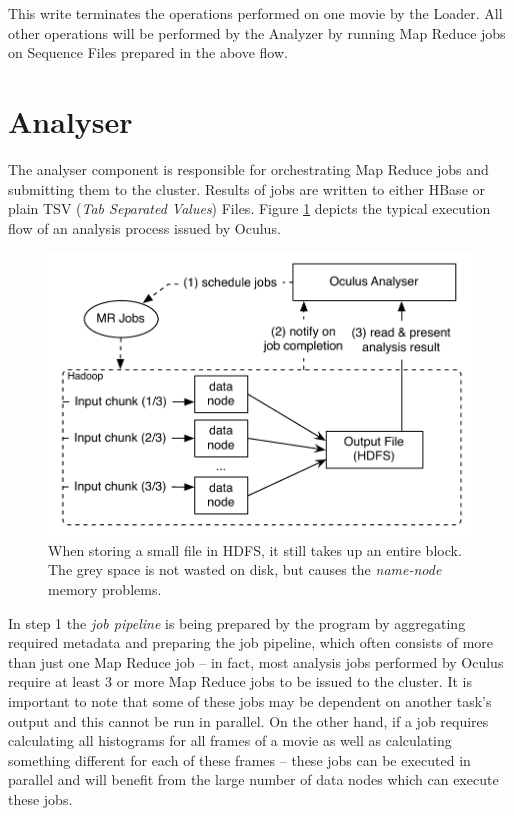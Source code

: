 This write terminates the operations performed on one movie by the Loader. All other operations will be performed by the Analyzer by running Map Reduce jobs on Sequence Files prepared in the above flow.

\section{Analyser}
\label{sec:analyser}
The analyser component is responsible for orchestrating Map Reduce jobs and submitting them to the cluster. Results of jobs are written to either HBase or plain TSV (\textit{Tab Separated Values}) Files. Figure \ref{fig:analyser-high-level} depicts the typical execution flow of an analysis process issued by Oculus.

\begin{figure}[ch!]
  \centering
  \includegraphics[scale=0.9]{diagrams/analyser-high-level.pdf}
  \caption{When storing a small file in HDFS, it still takes up an entire block. The grey space is not wasted on disk, but causes the \textit{name-node} memory problems.}
  \label{fig:analyser-high-level}
\end{figure}

In step 1 the \textit{job pipeline} is being prepared by the program by aggregating required metadata and preparing the job pipeline, which often consists of more than just one Map Reduce job -- in fact, most analysis jobs performed by Oculus require at least 3 or more Map Reduce jobs to be issued to the cluster. It is important to note that some of these jobs may be dependent on another task's output and this cannot be run in parallel. On the other hand, if a job requires calculating all histograms for all frames of a movie as well as calculating something different for each of these frames -- these jobs can be executed in parallel and will benefit from the large number of data nodes which can execute these jobs.

